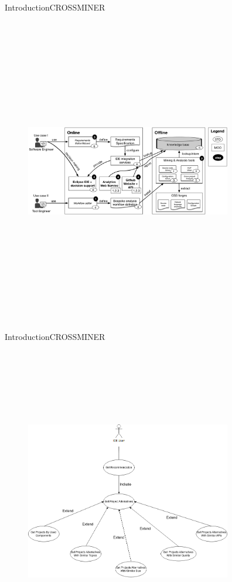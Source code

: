 \documentclass{beamer}
\begin{document}
\begin{frame}{Introduction}{CROSSMINER}
	\begin{figure}[!h]
	\includegraphics[width=9cm,height=13.5cm,keepaspectratio]{images/crossminer.png}
	\centering
	\label{fig:Crossminer}
	\end{figure}
\end{frame}

\begin{frame}{Introduction}{CROSSMINER}
	\begin{figure}[!h]
	\includegraphics[width=9cm,height=13.5cm,keepaspectratio]{images/UseCaseDiagram.png}
	\centering
	\label{fig:UseCaseDiagram}
	\end{figure}
\end{frame}
\end{document}
